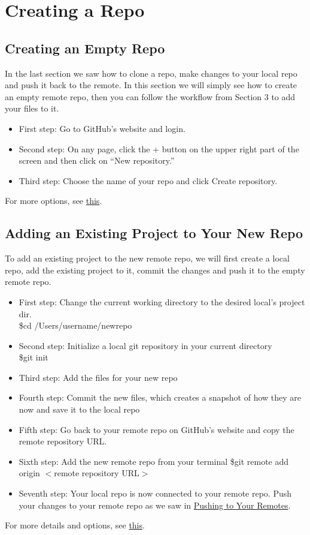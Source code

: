 \documentclass{article}
\begin{document}
    \section{Creating a Repo}
    \subsection{Creating an Empty Repo}
    In the last section we saw how to clone a repo, make changes to your local repo and push it back to the remote. In this section we will simply see how to create an empty remote repo, then you can follow the workflow from Section 3 to add your files to it.
    \begin{itemize}
        \item First step: Go to GitHub's website and login.
        \item Second step: On any page, click the + button on the upper right part of the screen and then click on ``New repository.''
        \item Third step: Choose the name of your repo and click Create repository.
    \end{itemize}
    For more options, see \href{https://help.github.com/articles/creating-a-new-repository/}{this}.
    \subsection{Adding an Existing Project to Your New Repo}
    To add an existing project to the new remote repo, we will first create a local repo, add the existing project to it, commit the changes and push it to the empty remote repo. 
    \begin{itemize}
        \item First step: Change the current working directory to the desired local's project dir. \\
        \newline
        \indent \$cd /Users/username/newrepo
        \item Second step: Initialize a local git repository in your current directory \\  
        \newline
        \indent \$git init
        \item Third step: Add the files for your new repo
        \item Fourth step: Commit the new files, which creates a snapshot of how they are now and save it to the local repo
        \item Fifth step: Go back to your remote repo on GitHub's website and copy the remote repository URL.
        \item Sixth step: Add the new remote repo from your terminal
        \indent \$git remote add origin $<$remote repository URL$>$
        \item Seventh step: Your local repo is now connected to your remote repo. Push your changes to your remote repo as we saw in \hyperref[sec:pushing]{Pushing to Your Remotes}.
    \end{itemize}
    For more details and options, see \href{https://help.github.com/articles/adding-an-existing-project-to-github-using-the-command-line/}{this}.
\end{document}
